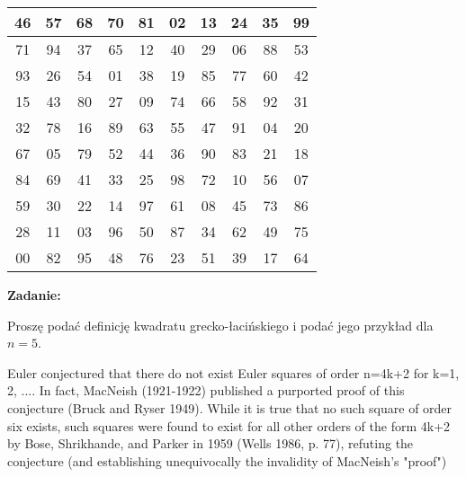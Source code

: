 \documentclass[12pt]{article} %
\begin{document}
\begin{tabular}{| c | c | c | c | c | c | c | c | c | c | }
\hline
 46  & 57 & 68 & 70 & 81 & 02 & 13 & 24 & 35 & 99  \\
\hline
 71  & 94 & 37 & 65 & 12 & 40 & 29 & 06 & 88 & 53  \\
\hline
 93  & 26 & 54 & 01 & 38 & 19 & 85 & 77 & 60 & 42  \\
\hline
 15 & 43 & 80 & 27 & 09 & 74 & 66 & 58 & 92 & 31  \\
\hline
 32 & 78 & 16 & 89 & 63 & 55 & 47 & 91 & 04 & 20  \\
\hline
 67  & 05 & 79 & 52 & 44 & 36 & 90 & 83 & 21 & 18  \\
\hline
 84  & 69 & 41 & 33 & 25 & 98 & 72 & 10 & 56 & 07  \\
\hline
  59 & 30 & 22 & 14 & 97 & 61 & 08 & 45 & 73 & 86  \\
\hline
  28 & 11 & 03 & 96 & 50 & 87 & 34 & 62 & 49 & 75  \\
\hline
  00 & 82 & 95 & 48 & 76 & 23 & 51 & 39 & 17 & 64  \\
\hline
\end{tabular}

{\bf Zadanie:}

Proszę podać definicję kwadratu grecko-łacińskiego i podać
jego przykład dla $n=5$.

Euler conjectured that there do not exist Euler squares of order n=4k+2 for k=1, 2, .... In fact, MacNeish (1921-1922) published a purported proof of this conjecture (Bruck and Ryser 1949). While it is true that no such square of order six exists, such squares were found to exist for all other orders of the form 4k+2 by Bose, Shrikhande, and Parker in 1959 (Wells 1986, p. 77), refuting the conjecture (and establishing unequivocally the invalidity of MacNeish's "proof")
\end{document}
